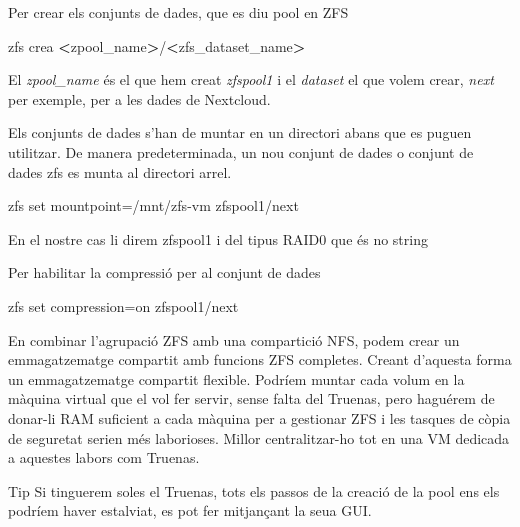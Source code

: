 \documentclass[
  10pt,
]{krantz}
\newenvironment{Shaded}{\begin{snugshade}}{\end{snugshade}}
\newcommand{\ExtensionTok}[1]{#1}
\newcommand{\NormalTok}[1]{#1}
\newcommand{\OperatorTok}[1]{\textcolor[rgb]{0.81,0.36,0.00}{\textbf{#1}}}
\begin{document}
Per crear els conjunts de dades, que es diu pool en ZFS

\begin{Shaded}
\begin{Highlighting}[]
\ExtensionTok{zfs}\NormalTok{ crea }\OperatorTok{\textless{}}\NormalTok{zpool\_name}\OperatorTok{\textgreater{}}\NormalTok{/}\OperatorTok{\textless{}}\NormalTok{zfs\_dataset\_name}\OperatorTok{\textgreater{}}
\end{Highlighting}
\end{Shaded}

El \emph{zpool\_name} és el que hem creat \emph{zfspool1} i el \emph{dataset} el que volem crear, \emph{next} per exemple, per a les dades de Nextcloud.

Els conjunts de dades s'han de muntar en un directori abans que es puguen utilitzar. De manera predeterminada, un nou conjunt de dades o conjunt de dades zfs es munta al directori arrel.

\begin{Shaded}
\begin{Highlighting}[]
\ExtensionTok{zfs}\NormalTok{ set mountpoint=/mnt/zfs{-}vm zfspool1/next}
\end{Highlighting}
\end{Shaded}

En el nostre cas li direm zfspool1 i del tipus RAID0 que és no string

Per habilitar la compressió per al conjunt de dades

\begin{Shaded}
\begin{Highlighting}[]
\ExtensionTok{zfs}\NormalTok{ set compression=on zfspool1/next}
\end{Highlighting}
\end{Shaded}

En combinar l'agrupació ZFS amb una compartició NFS, podem crear un emmagatzematge compartit amb funcions ZFS completes. Creant d'aquesta forma un emmagatzematge compartit flexible. Podríem muntar cada volum en la màquina virtual que el vol fer servir, sense falta del Truenas, pero haguérem de donar-li RAM suficient a cada màquina per a gestionar ZFS i les tasques de còpia de seguretat serien més laborioses. Millor centralitzar-ho tot en una VM dedicada a aquestes labors com Truenas.

\begin{rmdtip}{Tip}
Si tinguerem soles el Truenas, tots els passos de la creació de la pool ens els podríem haver estalviat, es pot fer mitjançant la seua GUI.

\end{rmdtip}
\end{document}
